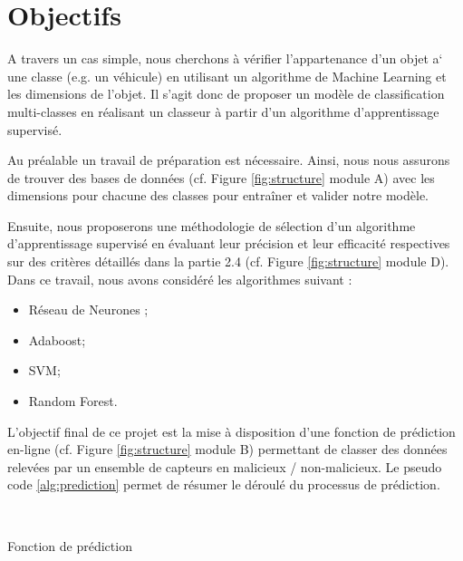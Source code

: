 \documentclass[a4paper]{report}
\begin{document}
\section{Objectifs}

A travers un cas simple, nous cherchons à vérifier l’appartenance d’un objet a` une classe (e.g. un véhicule) en utilisant un algorithme de Machine Learning et les dimensions de l’objet. Il s’agit donc de proposer un modèle de classification multi-classes en réalisant un classeur à partir d’un algorithme d’apprentissage supervisé.

Au préalable un travail de préparation est nécessaire. Ainsi, nous nous assurons de trouver des bases de données (cf. Figure \ref{fig:structure} module A) avec les dimensions pour chacune des classes pour entraîner et valider notre modèle.

Ensuite, nous proposerons une méthodologie de sélection d’un algorithme d’apprentissage supervisé en  évaluant leur précision et leur efficacité respectives sur des critères détaillés dans la partie 2.4 (cf. Figure \ref{fig:structure} module D). Dans ce travail, nous avons considéré les algorithmes suivant :
\begin{itemize}
\label{section:classifiers}
\item Réseau de Neurones ; 
\item Adaboost;
\item SVM;
\item Random Forest.
\end{itemize}
\medskip

\noindent L'objectif final de ce projet est la mise à disposition d’une fonction de prédiction en-ligne (cf. Figure \ref{fig:structure} module B) permettant de classer des données relevées par un ensemble de capteurs en malicieux / non-malicieux. Le pseudo code \ref{alg:prediction} permet de résumer le déroulé du processus de prédiction. 


~\par


\begin{algorithm}[h]
\SetAlgoLined

\medbreak


\medbreak


\medbreak

\caption{Fonction de prédiction\label{alg:prediction}}
\end{algorithm}
\end{document}
